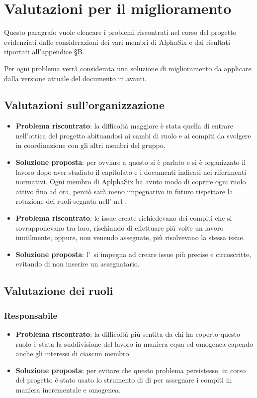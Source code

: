 \newpage
\section{Valutazioni per il miglioramento}
	
	Questo paragrafo vuole elencare i problemi riscontrati nel corso del progetto evidenziati dalle considerazioni dei vari membri di AlphaSix e dai risultati riportati all'appendice §B.
	
	Per ogni problema verrà considerata una soluzione di miglioramento da applicare dalla versione attuale del documento in avanti.

	\subsection{Valutazioni sull'organizzazione}
		\begin{itemize}
			\item \textbf{Problema riscontrato}: la difficoltà maggiore è stata quella di entrare nell'ottica del progetto abituandosi ai cambi di ruolo e ai compiti da svolgere in coordinazione con gli altri membri del gruppo.
			\item \textbf{Soluzione proposta}: per ovviare a questo si è parlato e si è organizzato il lavoro dopo aver studiato il capitolato e i documenti indicati nei riferimenti normativi. Ogni membro di AplphaSix ha avuto modo di coprire ogni ruolo attivo fino ad ora, perciò sarà meno impegnativo in futuro rispettare la rotazione dei ruoli segnata nell' nel \Doc{\PdPv}.
			\item \textbf{Problema riscontrato}: le issue create richiedevano dei compiti che si sovrapponevano tra loro, rischiando di effettuare più volte un lavoro inutilmente, oppure, non venendo assegnate, più  risolvevano la stessa issue.
			\item \textbf{Soluzione proposta}: l'\Amm\ si impegna ad creare issue più precise e circoscritte, evitando di non inserire un assegnatario.
		\end{itemize}
	
	\subsection{Valutazione dei ruoli}
	
		\subsubsection{Responsabile}
			\begin{itemize}
				\item \textbf{Problema riscontrato}: la difficoltà più sentita da chi ha coperto questo ruolo è stata la suddivisione del lavoro in maniera equa ed omogenea capendo anche gli interessi di ciascun membro.
				\item \textbf{Soluzione proposta}: per evitare che questo problema persistesse, in corso del progetto è stato usato lo strumento di  di  per assegnare i compiti in maniera incrementale e omogenea.
			\end{itemize}

